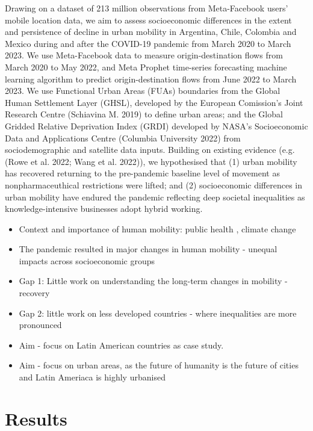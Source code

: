 \documentclass[
  11pt,
]{article}
\providecommand{\tightlist}{%
  \setlength{\itemsep}{0pt}\setlength{\parskip}{0pt}}\usepackage{longtable,booktabs,array}
\begin{document}
Drawing on a dataset of 213 million observations from Meta-Facebook
users' mobile location data, we aim to assess socioeconomic differences
in the extent and persistence of decline in urban mobility in Argentina,
Chile, Colombia and Mexico during and after the COVID-19 pandemic from
March 2020 to March 2023. We use Meta-Facebook data to measure
origin-destination flows from March 2020 to May 2022, and Meta Prophet
time-series forecasting machine learning algorithm to predict
origin-destination flows from June 2022 to March 2023. We use Functional
Urban Areas (FUAs) boundaries from the Global Human Settlement Layer
(GHSL), developed by the European Comission's Joint Research Centre
(Schiavina M. 2019) to define urban areas; and the Global Gridded
Relative Deprivation Index (GRDI) developed by NASA's Socioeconomic Data
and Applications Centre (Columbia University 2022) from sociodemographic
and satellite data inputs. Building on existing evidence (e.g. (Rowe et
al. 2022; Wang et al. 2022)), we hypothesised that (1) urban mobility
has recovered returning to the pre-pandemic baseline level of movement
as nonpharmaceuthical restrictions were lifted; and (2) socioeconomic
differences in urban mobility have endured the pandemic reflecting deep
societal inequalities as knowledge-intensive businesses adopt hybrid
working.

\begin{itemize}
\tightlist
\item
  Context and importance of human mobility: public health , climate
  change\\
\item
  The pandemic resulted in major changes in human mobility - unequal
  impacts across socioeconomic groups\\
\item
  Gap 1: Little work on understanding the long-term changes in mobility
  - recovery\\
\item
  Gap 2: little work on less developed countries - where inequalities
  are more pronounced\\
\item
  Aim - focus on Latin American countries as case study.
\item
  Aim - focus on urban areas, as the future of humanity is the future of
  cities and Latin Ameriaca is highly urbanised
\end{itemize}

\hypertarget{sec-results}{%
\section{Results}\label{sec-results}}
\end{document}
